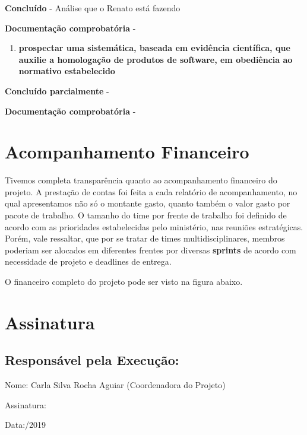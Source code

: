 \textbf{Concluído} - Análise que o Renato está fazendo

\textbf{Documentação comprobatória} -

\begin{enumerate}
\def\labelenumi{\arabic{enumi}.}
\setcounter{enumi}{2}
\tightlist
\item
  \textbf{prospectar uma sistemática, baseada em evidência científica,
  que auxilie a homologação de produtos de software, em obediência ao
  normativo estabelecido}
\end{enumerate}

\textbf{Concluído parcialmente} -

\textbf{Documentação comprobatória} -

\hypertarget{acompanhamento-financeiro}{%
\section{Acompanhamento Financeiro}\label{acompanhamento-financeiro}}

Tivemos completa transparência quanto ao acompanhamento financeiro do
projeto. A prestação de contas foi feita a cada relatório de
acompanhamento, no qual apresentamos não só o montante gasto, quanto
também o valor gasto por pacote de trabalho. O tamanho do time por
frente de trabalho foi definido de acordo com as prioridades
estabelecidas pelo ministério, nas reuniões estratégicas. Porém, vale
ressaltar, que por se tratar de times multidisciplinares, membros
poderiam ser alocados em diferentes frentes por diversas
\textbf{sprints} de acordo com necessidade de projeto e deadlines de
entrega.

O financeiro completo do projeto pode ser visto na figura abaixo.

\hypertarget{assinatura}{%
\section{Assinatura}\label{assinatura}}

\hypertarget{responsuxe1vel-pela-execuuxe7uxe3o}{%
\subsection{Responsável pela
Execução:}\label{responsuxe1vel-pela-execuuxe7uxe3o}}

Nome: Carla Silva Rocha Aguiar (Coordenadora do Projeto)

Assinatura:

Data:/2019


